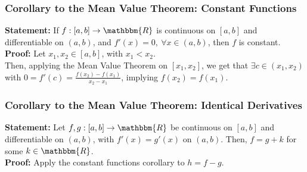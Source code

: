 \documentclass[10pt]{extarticle}
\newcommand{\R}{\mathbbm{R}}
\begin{document}
  \subsubsection{Corollary to the Mean Value Theorem: Constant Functions}%
  \textbf{Statement:} If $f:[a,b]\rightarrow \R$ is continuous on $[a,b]$ and differentiable on $(a,b)$, and $f'(x) = 0,~\forall x\in (a,b)$, then $f$ is constant.\\

  \textbf{Proof:} Let $x_1, x_2\in [a,b]$, with $x_1 < x_2$.\\

  Then, applying the Mean Value Theorem on $[x_1,x_2]$, we get that $\exists c\in (x_1,x_2)$ with $0 = f'(c) = \frac{f(x_2)-f(x_1)}{x_2-x_1}$, implying $f(x_2) = f(x_1)$.
  \subsubsection{Corollary to the Mean Value Theorem: Identical Derivatives}%
  \textbf{Statement:} Let $f,g: [a,b]\rightarrow \R$ be continuous on $[a,b]$ and differentiable on $(a,b)$, with $f'(x) = g'(x)$ on $(a,b)$. Then, $f = g + k$ for some $k\in\R$.\\

  \textbf{Proof:} Apply the constant functions corollary to $h = f-g$.
\end{document}
